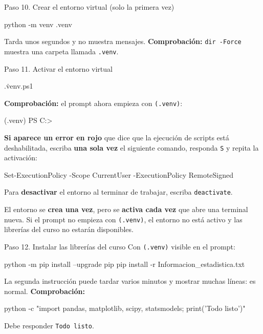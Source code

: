 \documentclass[11pt,a4paper]{article}
\newenvironment{terminal}{\begin{tcolorbox}[terminal]}{\end{tcolorbox}}
\newcommand{\cmd}[1]{\texttt{\textcolor{petroleo}{#1}}}
\begin{document}
\begin{paso}{Paso 10. Crear el entorno virtual (solo la primera vez)}
\begin{terminal}
\begin{comando}
python -m venv .venv
\end{comando}
\end{terminal}
Tarda unos segundos y no muestra mensajes. \textbf{Comprobación:} \cmd{dir -Force} muestra una carpeta llamada \texttt{.venv}.
\end{paso}

\begin{paso}{Paso 11. Activar el entorno virtual}
\begin{terminal}
\begin{comando}
.\.venv\Scripts\Activate.ps1
\end{comando}
\end{terminal}
\textbf{Comprobación:} el prompt ahora empieza con \texttt{(.venv)}:
\begin{terminal}
\begin{comando}
(.venv) PS C:\Users\Ana\Documents\Estadistica>
\end{comando}
\end{terminal}
\textbf{Si aparece un error en rojo} que dice que la ejecución de scripts está deshabilitada, escriba \textbf{una sola vez} el siguiente comando, responda \texttt{S} y repita la activación:
\begin{terminal}
\begin{comando}
Set-ExecutionPolicy -Scope CurrentUser -ExecutionPolicy RemoteSigned
\end{comando}
\end{terminal}
Para \textbf{desactivar} el entorno al terminar de trabajar, escriba \cmd{deactivate}.
\end{paso}

\begin{nota}
El entorno se \textbf{crea una vez}, pero se \textbf{activa cada vez} que abre una terminal nueva. Si el prompt no empieza con \texttt{(.venv)}, el entorno no está activo y las librerías del curso no estarán disponibles.
\end{nota}

\begin{paso}{Paso 12. Instalar las librerías del curso}
Con \texttt{(.venv)} visible en el prompt:
\begin{terminal}
\begin{comando}
python -m pip install --upgrade pip
pip install -r Informacion_estadistica\requirements.txt
\end{comando}
\end{terminal}
La segunda instrucción puede tardar varios minutos y mostrar muchas líneas: es normal. \textbf{Comprobación:}
\begin{terminal}
\begin{comando}
python -c "import pandas, matplotlib, scipy, statsmodels; print('Todo listo')"
\end{comando}
\end{terminal}
Debe responder \texttt{Todo listo}.
\end{paso}
\end{document}
